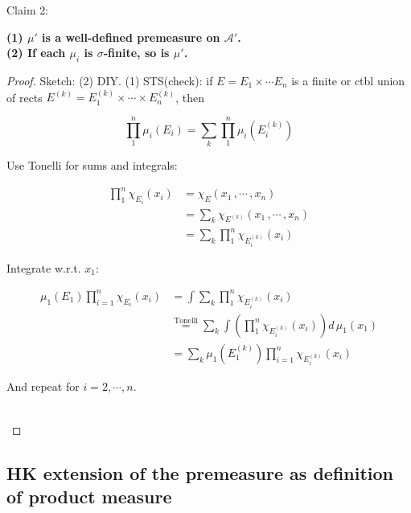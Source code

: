 \documentclass{qlnotes-export}
\begin{document}
Claim 2:

\begin{proposition}\label{prop-06-product-measure-fubini-tonelli-proposition-004}

\textbf{(1) \(\mu'\) is a well-defined premeasure on \(\mathcal{A}'\).\\
(2) If each \(\mu_{i}\) is \(\sigma\)-finite, so is \(\mu'\).}

\end{proposition}

\begin{proof}

Sketch: (2) DIY. (1) STS(check): if \(E = E_{1} \times \cdots E_{n}\) is a finite or ctbl union of rects \(E^{(k)} = E_{1}^{(k)} \times \cdots \times E_{n}^{(k)}\), then

\[\prod\limits_{1}^{n}\mu_{i}(E_{i}) = \sum\limits_{k}\prod\limits_{1}^{n}\mu_{i}(E_{i}^{(k)})\]

Use Tonelli for sums and integrals:

\[\begin{matrix}
{\prod\limits_{1}^{n}\chi_{E_{i}}(x_{i})} & {= \chi_{E}(x_{1}\,,\cdots\,,x_{n})} \\
 & {= \sum\limits_{k}\chi_{E^{(k)}}(x_{1}\,,\cdots\,,x_{n})} \\
 & {= \sum\limits_{k}\prod\limits_{1}^{n}\chi_{E_{i}^{(k)}}(x_{i})}
\end{matrix}\]

Integrate w.r.t. \(x_{1}\):

\[\begin{matrix}
{\mu_{1}(E_{1})\prod\limits_{i = 1}^{n}\chi_{E_{i}}(x_{i})} & {= \int\sum\limits_{k}\prod\limits_{1}^{n}\chi_{E_{i}^{(k)}}(x_{i})} \\
 & {\overset{\text{Tonelli}}{=}\sum\limits_{k}\int(\prod\limits_{1}^{n}\chi_{E_{i}^{(k)}}(x_{i}))d\,\mu_{1}(x_{1})} \\
 & {= \sum\limits_{k}\mu_{1}(E_{1}^{(k)})\prod\limits_{i = 1}^{n}\chi_{E_{i}^{(k)}}(x_{i})}
\end{matrix}\]

And repeat for \(i = 2,\cdots,n\).\\
\strut \\

\end{proof}

\subsection{HK extension of the premeasure as definition of product measure}\label{hk-extension-of-the-premeasure-as-definition-of-product-measure}
\end{document}
